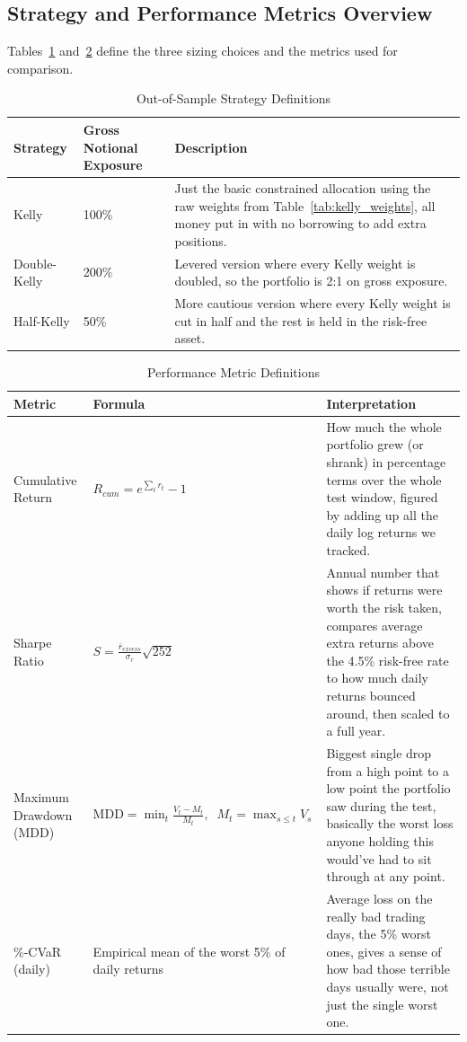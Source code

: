 \documentclass[11pt,a4paper]{article}
\begin{document}
\subsection{Strategy and Performance Metrics Overview}

Tables~\ref{tab:strategy_defs} and~\ref{tab:metric_defs} define the three sizing choices and the metrics used for comparison.

\begin{table}[H]
\centering
\caption{Out-of-Sample Strategy Definitions}
\label{tab:strategy_defs}
\begin{tabularx}{\textwidth}{l l X}
\toprule
Strategy & Gross Notional Exposure & Description \\
\midrule
Kelly        & 100\% & Just the basic constrained allocation using the raw weights from Table~\ref{tab:kelly_weights}, all money put in with no borrowing to add extra positions. \\
Double-Kelly & 200\% & Levered version where every Kelly weight is doubled, so the portfolio is 2:1 on gross exposure. \\
Half-Kelly   & 50\%  & More cautious version where every Kelly weight is cut in half and the rest is held in the risk-free asset. \\
\bottomrule
\end{tabularx}
\end{table}


\begin{table}[H]
\centering
\caption{Performance Metric Definitions}
\label{tab:metric_defs}
{\small\setlength{\tabcolsep}{4pt}\renewcommand{\arraystretch}{1.15}\begin{tabularx}{\textwidth}{>{\raggedright\arraybackslash}p{3.3cm} >{\raggedright\arraybackslash}p{5.2cm} X}
\toprule
Metric & Formula & Interpretation \\
\midrule
Cumulative Return & \(\displaystyle R_{cum} = e^{\sum_t r_t} - 1\) & How much the whole portfolio grew (or shrank) in percentage terms over the whole test window, figured by adding up all the daily log returns we tracked. \\
Sharpe Ratio & \(\displaystyle S = \frac{\bar{r}_{excess}}{\sigma_r}\sqrt{252}\) & Annual number that shows if returns were worth the risk taken, compares average extra returns above the 4.5\% risk-free rate to how much daily returns bounced around, then scaled to a full year. \\
Maximum Drawdown (MDD) & \(\displaystyle \text{MDD} = \min_t \frac{V_t - M_t}{M_t}, \;\; M_t=\max_{s \leq t} V_s\) & Biggest single drop from a high point to a low point the portfolio saw during the test, basically the worst loss anyone holding this would've had to sit through at any point. \\
95\%-CVaR (daily) & Empirical mean of the worst 5\% of daily returns & Average loss on the really bad trading days, the 5\% worst ones, gives a sense of how bad those terrible days usually were, not just the single worst one. \\
\bottomrule
\end{tabularx}}
\end{table}
\end{document}
